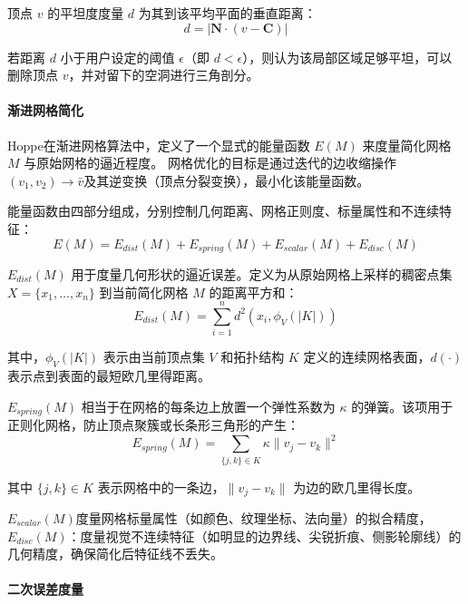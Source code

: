 \documentclass[12pt]{article}
\begin{document}
顶点 $v$ 的平坦度度量 $d$ 为其到该平均平面的垂直距离：
\begin{equation}
d = |\mathbf{N} \cdot (v - \mathbf{C})|
\end{equation}

若距离 $d$ 小于用户设定的阈值 $\epsilon$（即 $d < \epsilon$），则认为该局部区域足够平坦，可以删除顶点 $v$，并对留下的空洞进行三角剖分。

\paragraph{渐进网格简化}

Hoppe在渐进网格算法中，定义了一个显式的能量函数 $E(M)$ 来度量简化网格 $M$ 与原始网格的逼近程度。
网格优化的目标是通过迭代的边收缩操作$(v_1, v_2) \to \bar{v}$及其逆变换（顶点分裂变换），最小化该能量函数。

能量函数由四部分组成，分别控制几何距离、网格正则度、标量属性和不连续特征：
\begin{equation}
E(M) = E_{dist}(M) + E_{spring}(M) + E_{scalar}(M) + E_{disc}(M)
\end{equation}

$E_{dist}(M)$ 用于度量几何形状的逼近误差。定义为从原始网格上采样的稠密点集 $X = \{x_1, \dots, x_n\}$ 到当前简化网格 $M$ 的距离平方和：
\begin{equation}
E_{dist}(M) = \sum_{i=1}^{n} d^2(x_i, \phi_V(|K|))
\end{equation}

其中，$\phi_V(|K|)$ 表示由当前顶点集 $V$ 和拓扑结构 $K$ 定义的连续网格表面，$d(\cdot)$ 表示点到表面的最短欧几里得距离。

$E_{spring}(M)$ 相当于在网格的每条边上放置一个弹性系数为 $\kappa$ 的弹簧。该项用于正则化网格，防止顶点聚簇或长条形三角形的产生：
\begin{equation}
E_{spring}(M) = \sum_{\{j, k\} \in K} \kappa \|v_j - v_k\|^2
\end{equation}

其中 $\{j, k\} \in K$ 表示网格中的一条边，$\|v_j - v_k\|$ 为边的欧几里得长度。

$E_{scalar}(M)$度量网格标量属性（如颜色、纹理坐标、法向量）的拟合精度，
$E_{disc}(M)$：度量视觉不连续特征（如明显的边界线、尖锐折痕、侧影轮廓线）的几何精度，确保简化后特征线不丢失。

\paragraph{二次误差度量}
\end{document}
